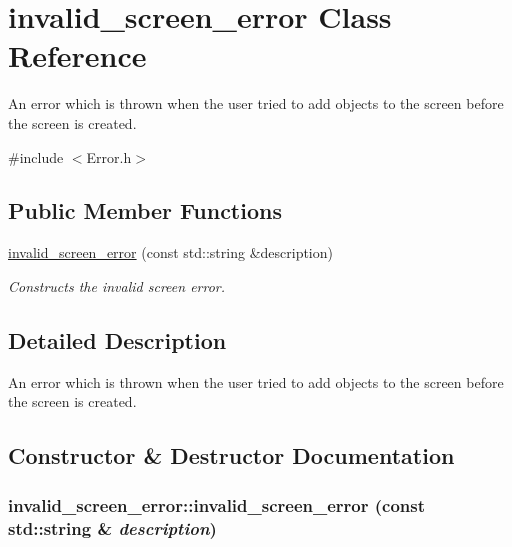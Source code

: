 \hypertarget{classinvalid__screen__error}{
\section{invalid\_\-screen\_\-error Class Reference}
\label{classinvalid__screen__error}
}


An error which is thrown when the user tried to add objects to the screen before the screen is created.  


{\ttfamily \#include $<$Error.h$>$}\subsection*{Public Member Functions}
\begin{DoxyCompactItemize}
\item 
\hyperlink{classinvalid__screen__error_a07a91b25c65a2c43c4975519650d64b5}{invalid\_\-screen\_\-error} (const std::string \&description)
\begin{DoxyCompactList}\small\item\em Constructs the invalid screen error. \item\end{DoxyCompactList}\end{DoxyCompactItemize}


\subsection{Detailed Description}
An error which is thrown when the user tried to add objects to the screen before the screen is created. 

\subsection{Constructor \& Destructor Documentation}
\hypertarget{classinvalid__screen__error_a07a91b25c65a2c43c4975519650d64b5}{
\subsubsection[{invalid\_\-screen\_\-error}]{\setlength{\rightskip}{0pt plus 5cm}invalid\_\-screen\_\-error::invalid\_\-screen\_\-error (const std::string \& {\em description})}}
\label{classinvalid__screen__error_a07a91b25c65a2c43c4975519650d64b5}


